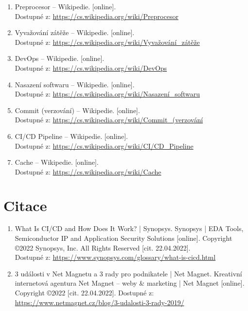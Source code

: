 \documentclass[12pt,a4paper]{report}
\begin{document}
\begin{enumerate}
    \item \noindent Preprocesor – Wikipedie. [online]. \\ Dostupné z: \url{https://cs.wikipedia.org/wiki/Preprocesor}

    \item \noindent  Vyvažování zátěže – Wikipedie. [online]. \\ Dostupné z: \url{https://cs.wikipedia.org/wiki/Vyvažování\_zátěže}
  
    \item \noindent DevOps – Wikipedie. [online]. \\ Dostupné z: \url{https://cs.wikipedia.org/wiki/DevOps}
  
    \item \noindent Nasazení softwaru – Wikipedie. [online]. \\ Dostupné z: \url{https://cs.wikipedia.org/wiki/Nasazení\_softwaru}
  
    \item \noindent Commit (verzování) – Wikipedie. [online]. \\ Dostupné z: \url{https://cs.wikipedia.org/wiki/Commit\_(verzování}
  
    \item \noindent CI/CD Pipeline – Wikipedie. [online]. \\ Dostupné z: \url{https://cs.wikipedia.org/wiki/CI/CD\_Pipeline}
  
    \item \noindent Cache – Wikipedie. [online]. \\ Dostupné z: \url{https://cs.wikipedia.org/wiki/Cache}
\end{enumerate}
  
  
  \chapter{Citace}\small
  \begin{enumerate}
    
  \item What Is CI/CD and How Does It Work? | Synopsys. Synopsys | EDA Tools, Semiconductor IP and Application Security Solutions [online]. Copyright ©2022 Synopsys, Inc. All Rights Reserved [cit. 22.04.2022]. 
  \\Dostupné z: \url{https://www.synopsys.com/glossary/what-is-cicd.html }\\
  
  \item 3 události v Net Magnetu a 3 rady pro podnikatele | Net Magnet. Kreativní internetová agentura Net Magnet – weby \& marketing | Net Magnet [online]. Copyright ©2022 [cit. 22.04.2022]. Dostupné z: \url{https://www.netmagnet.cz/blog/3-udalosti-3-rady-2019/}
  
  \end{enumerate}
\end{document}
